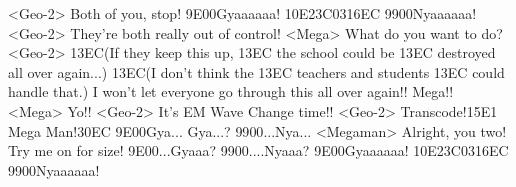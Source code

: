 <Geo-2> Both of you, stop! 
{9E}{00}Gyaaaaaa! 
{10}{E2}{3C}{03}{16}{EC} 
{99}{00}Nyaaaaaa! 
<Geo-2> They're both really out of control! 
<Mega> What do you want to do? 
<Geo-2> {13}{EC}(If they keep this up, {13}{EC} the school could be {13}{EC} destroyed all over again...) 
{13}{EC}(I don't think the {13}{EC} teachers and students {13}{EC} could handle that.) 
I won't let everyone go through this all over again!! 
Mega!! 
<Mega> Yo!! 
<Geo-2> It's EM Wave Change time!! 
<Geo-2> Transcode!{15}{E1} Mega Man!{30}{EC}
{9E}{00}Gya... Gya...? 
{99}{00}...Nya... 
<Megaman> Alright, you two! Try me on for size! 
{9E}{00}...Gyaaa? 
{99}{00}....Nyaaa? 
{9E}{00}Gyaaaaaa! 
{10}{E2}{3C}{03}{16}{EC} 
{99}{00}Nyaaaaaa! 
